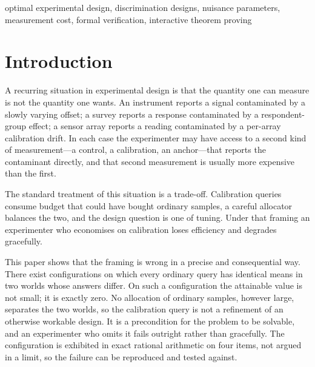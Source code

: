 \documentclass[conference]{IEEEtran}
\theoremstyle{definition}
\begin{document}
\begin{IEEEkeywords}
optimal experimental design, discrimination designs, nuisance parameters, measurement cost,
formal verification, interactive theorem proving
\end{IEEEkeywords}

\section{Introduction}

A recurring situation in experimental design is that the quantity one can measure is not the
quantity one wants. An instrument reports a signal contaminated by a slowly varying offset;
a survey reports a response contaminated by a respondent-group effect; a sensor array
reports a reading contaminated by a per-array calibration drift. In each case the
experimenter may have access to a second kind of measurement---a control, a calibration, an
anchor---that reports the contaminant directly, and that second measurement is usually more
expensive than the first.

The standard treatment of this situation is a trade-off. Calibration queries consume budget
that could have bought ordinary samples, a careful allocator balances the two, and the
design question is one of tuning. Under that framing an experimenter who economises on
calibration loses efficiency and degrades gracefully.

This paper shows that the framing is wrong in a precise and consequential way. There exist
configurations on which every ordinary query has identical means in two worlds whose
answers differ. On such a configuration the attainable value is not small; it is exactly
zero. No allocation of ordinary samples, however large, separates the two worlds, so the
calibration query is not a refinement of an otherwise workable design. It is a precondition
for the problem to be solvable, and an experimenter who omits it fails outright rather than
gracefully. The configuration is exhibited in exact rational arithmetic on four items, not
argued in a limit, so the failure can be reproduced and tested against.
\end{document}
